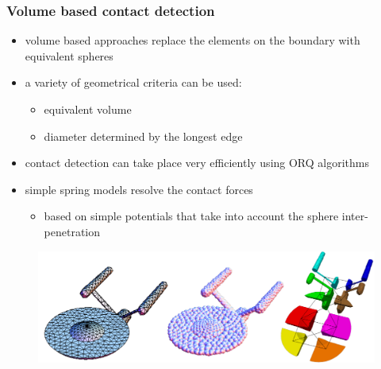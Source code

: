 \begin{frame}[fragile]
%
  \frametitle{Volume based contact detection}
%
  \begin{itemize}
%
  \item volume based approaches replace the elements on the boundary with equivalent spheres
  \item a variety of geometrical criteria can be used: 
    \begin{itemize}
      \item equivalent volume
      \item diameter determined by the longest edge
    \end{itemize}
% 
  \item contact detection can take place very efficiently using ORQ algorithms
  \item simple spring models resolve the contact forces
    \begin{itemize}
    \item based on simple potentials that take into account the sphere inter-penetration
    \end{itemize}
%
  \end{itemize}
%
  \begin{figure}
    \includegraphics[scale=0.5]{figures/mesh-volumecontact.pdf}
  \end{figure}
%
\end{frame}

